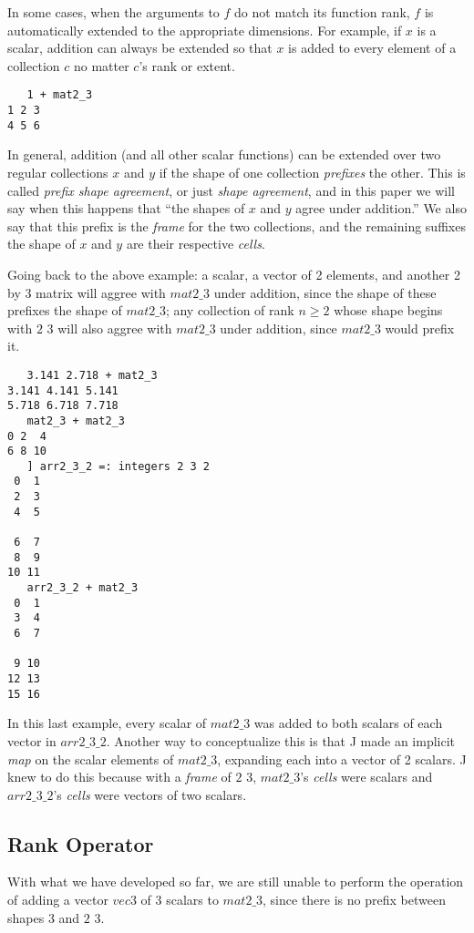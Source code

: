 In some cases, when the arguments to $f$  do not match its function rank, $f$  is automatically extended to the appropriate dimensions.
For example, if $x$ is a scalar, addition can always be extended so that $x$ is added to every element of a collection $c$ 
no matter $c$'s rank or extent. 
\begin{verbatim}
   1 + mat2_3
1 2 3
4 5 6
\end{verbatim}

In general, addition (and all other scalar functions) can be extended over two regular collections $x$ and $y$ 
if the shape of one collection \textit{prefixes} the other.
This is called \textit{prefix shape agreement}, or just \textit{shape agreement},\cite{rankanduni} 
and in this paper we will say when this happens that ``the shapes of $x$ and $y$ agree under addition.''
We also say that this prefix is the \textit{frame} for the two collections,
and the remaining suffixes the shape of $x$ and $y$ are their respective \textit{cells}.

Going back to the above example: a scalar, a vector of 2 elements, and another 2 by 3 matrix will aggree with $mat2\_3$ under addition, since the shape of these prefixes the shape of $mat2\_3$; 
any collection of rank $n \ge 2$ whose shape begins with $2$ $3$ will also aggree with $mat2\_3$ under addition, since $mat2\_3$ would prefix it.

\begin{verbatim}
   3.141 2.718 + mat2_3
3.141 4.141 5.141
5.718 6.718 7.718
   mat2_3 + mat2_3
0 2  4
6 8 10
   ] arr2_3_2 =: integers 2 3 2
 0  1
 2  3
 4  5

 6  7
 8  9
10 11
   arr2_3_2 + mat2_3
 0  1
 3  4
 6  7

 9 10
12 13
15 16
\end{verbatim}

In this last example, every scalar of $mat2\_3$ was added to both scalars of each vector in $arr2\_3\_2$. 
Another way to conceptualize this is that J made an implicit \textit{map} on the scalar elements of $mat2\_3$, 
expanding each into a vector of 2 scalars.
J knew to do this because with a \textit{frame} of $2$ $3$, $mat2\_3$'s \textit{cells} were scalars and 
$arr2\_3\_2$'s \textit{cells} were vectors of two scalars.

\subsection{Rank Operator}
With what we have developed so far, we are still unable to perform the operation of 
adding a vector $vec3$ of 3 scalars to $mat2\_3$, since there is no prefix between shapes $3$ and $2$ $3$.

